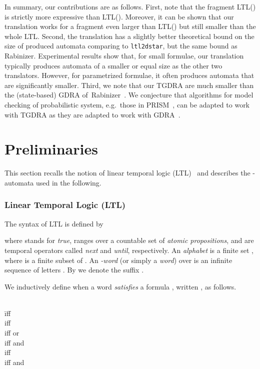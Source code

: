 \documentclass{llncs}
\begin{document}
In summary, our contributions are as follows.  First, note that the
fragment LTL() is strictly more expressive than
LTL(). Moreover, it can be shown that our translation works for a
fragment even larger than LTL() but still smaller than the
whole LTL. 
Second, the translation has a slightly better theoretical bound on the
size of produced automata comparing to \texttt{ltl2dstar}, but the same
bound as Rabinizer. Experimental results show that, for small formulae,
our translation typically produces automata of a smaller or equal size
as the other two translators.  However, for parametrized formulae, it
often produces automata that are significantly smaller. Third, we note
that our TGDRA are much smaller than the (state-based) GDRA
of~Rabinizer~\cite{GKE12}. We conjecture that algorithms for model checking of
probabilistic system, e.g.~those in PRISM~\cite{KNP11}, can be adapted
to work with TGDRA as they are adapted to work with GDRA~\cite{CGK13}.














\section{Preliminaries}\label{sec:prelim}
This section recalls the notion of linear temporal logic (LTL)~\cite{Pnu77} 
and describes the -automata used in the following.



\subsubsection{Linear Temporal Logic (LTL)}

The syntax of LTL is defined by

where  stands for \emph{true},  ranges over a countable set 
of \emph{atomic propositions},  and  are temporal operators called
\emph{next} and \emph{until}, respectively. An \emph{alphabet} is a finite
set , where  is a finite subset of . An
\emph{-word} (or simply a \emph{word}) over  is an infinite
sequence of letters . By  we
denote the suffix .


We inductively define when a word  \emph{satisfies} a formula ,
written , as follows.
\begin{center}
\begin{tabbing}
  \hspace*{1em} \= \\
  \>  \hspace*{2.7em} \= iff~ \= \\
  \>  \> iff \> \\
  \>  \> iff \>
   or \\
  \>  \> iff \>
   and \\
  \>  \> iff \> \\
  \>  \> iff \>
      and
     
\end{tabbing}
\end{center}
\end{document}

